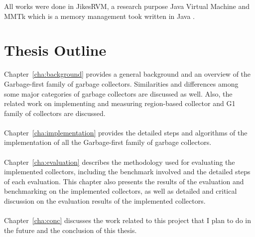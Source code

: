 All works were done in JikesRVM, a research purpose Java Virtual Machine and MMTk
which is a memory management took written in Java \citep{blackburn2004oil}.

\section{Thesis Outline}

Chapter~\ref{cha:background}
provides a general background and an overview of the Garbage-first family of garbage collectors.
Similarities and differences among some major categories of garbage collectors are discussed as well.
Also, the related work on implementing and measuring region-based collector and G1 family
of collectors are discussed.
\\\\
Chapter~\ref{cha:implementation} provides the detailed steps and algorithms of the implementation of
all the Garbage-first family of garbage collectors.
\\\\
Chapter~\ref{cha:evaluation}
describes the methodology used for evaluating the implemented collectors,
including the benchmark involved and the detailed steps of each evaluation.
This chapter also presents the results of the evaluation and benchmarking on the implemented collectors,
as well as detailed and critical discussion on the evaluation results of the
implemented collectors.
\\\\
Chapter~\ref{cha:conc} discusses the work related to this project that I plan to do in the future and the conclusion of this thesis.